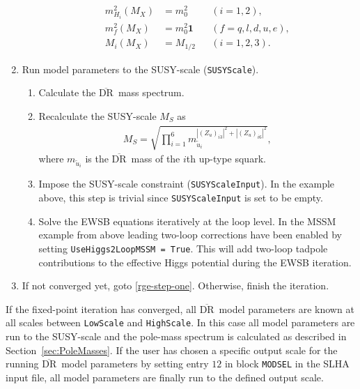 \documentclass[final,3p,11pt,pdflatex]{elsarticle}
\newcommand{\code}[1]{\lstinline|#1|}  %
\newcommand{\textoverline}[1]{$\overline{\mbox{#1}}$}
\newcommand{\DRbar}{\textoverline{DR}\xspace}
\newcommand{\secref}[1]{Section~\ref{#1}}
\begin{document}
\begin{enumerate}
\begin{enumerate}
\begin{align}
      m_{H_i}^2(M_X) &= m_0^2 & &(i=1,2),\\
      m_{f}^2(M_X) &= m_0^2\mathbf{1} & &(f=q,l,d,u,e),\\
      M_{i}(M_X) &= M_{1/2} & &(i=1,2,3).
    \end{align}\label{eq:fs-cmssm-high-scale-bc}%
  \end{enumerate}
\item Run model parameters to the SUSY-scale (\code{SUSYScale}).
  \begin{enumerate}
  \item Calculate the \DRbar\ mass spectrum.
  \item Recalculate the SUSY-scale $M_S$ as
    \begin{align}
      M_S = \sqrt{\prod_{i=1}^6 m_{\tilde{u}_i}^{|(Z_u)_{i3}|^2 + |(Z_u)_{i6}|^2}} ,
    \end{align}
    where $m_{\tilde{u}_i}$ is the \DRbar\ mass of the $i$th up-type
    squark.
  \item Impose the SUSY-scale constraint (\code{SUSYScaleInput}).  In
    the example above, this step is trivial since
    \code{SUSYScaleInput} is set to be empty.
  \item Solve the EWSB equations iteratively at the loop level.  In
    the MSSM example from above leading two-loop corrections have been
    enabled by setting \code{UseHiggs2LoopMSSM = True}.  This will
    add two-loop tadpole contributions to the effective Higgs
    potential during the EWSB iteration.
  \end{enumerate}
\item If not converged yet, goto \ref{rge-step-one}.  Otherwise,
  finish the iteration.
\end{enumerate}
%
If the fixed-point iteration has converged, all \DRbar\ model
parameters are known at all scales between \code{LowScale} and
\code{HighScale}.  In this case all model parameters are run to the
SUSY-scale and the pole-mass spectrum is calculated as described in
\secref{sec:PoleMasses}.  If the user has chosen a specific output
scale for the running \DRbar\ model parameters by setting entry $12$
in block \code{MODSEL} in the SLHA input file, all model parameters
are finally run to the defined output scale.
%
\end{document}
